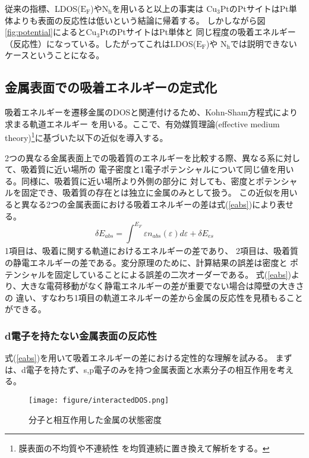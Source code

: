 \documentclass[12pt]{ltjsarticle}
\begin{document}
従来の指標、LDOS($\text{E}_\text{F}$)や$\text{N}_\text{h}$を用いると以上の事実は
$\text{Cu}_\text{3}$PtのPtサイトはPt単体よりも表面の反応性は低いという結論に帰着する。
しかしながら図\ref{fig:potential}によると$\text{Cu}_\text{3}$PtのPtサイトはPt単体と
同じ程度の吸着エネルギー（反応性）になっている。したがってこれはLDOS($\text{E}_\text{F}$)や
$\text{N}_\text{h}$では説明できないケースということになる。

\subsection{金属表面での吸着エネルギーの定式化}
吸着エネルギーを遷移金属のDOSと関連付けるため、Kohn-Sham方程式により求まる軌道エネルギー
を用いる。ここで、有効媒質理論(effective medium theory)\footnote{膜表面の不均質や不連続性
を均質連続に置き換えて解析をする。}に基づいた以下の近似を導入する。

2つの異なる金属表面上での吸着質のエネルギーを比較する際、異なる系に対して、吸着質に近い場所の
電子密度と1電子ポテンシャルについて同じ値を用いる。同様に、吸着質に近い場所より外側の部分に
対しても、密度とポテンシャルを固定でき、吸着質の存在とは独立に金属のみとして扱う。
この近似を用いると異なる2つの金属表面における吸着エネルギーの差は式(\ref{eabs})により表せる。
\begin{equation}
    \label{eabs}
    \delta E_{abs} = \int_{}^{E_F} \varepsilon n_{abs}(\varepsilon) d\varepsilon + 
    \delta E_{es}
\end{equation}
1項目は、吸着に関する軌道におけるエネルギーの差であり、
2項目は、吸着質の静電エネルギーの差である。変分原理のために、計算結果の誤差は密度と
ポテンシャルを固定していることによる誤差の二次オーダーである。
式(\ref{eabs})より、大きな電荷移動がなく静電エネルギーの差が重要でない場合は障壁の大きさの
違い、すなわち1項目の軌道エネルギーの差から金属の反応性を見積もることができる。

\subsubsection{d電子を持たない金属表面の反応性}
式(\ref{eabs})を用いて吸着エネルギーの差における定性的な理解を試みる。
まずは、d電子を持たず、s,p電子のみを持つ金属表面と水素分子の相互作用を考える。
\begin{figure}[hbtp]
    \begin{center}
     \texttt{[image: figure/interactedDOS.png]}
    \end{center}
    \caption{分子と相互作用した金属の状態密度}
    \label{fig:interactedDOS}
\end{figure}
\end{document}
